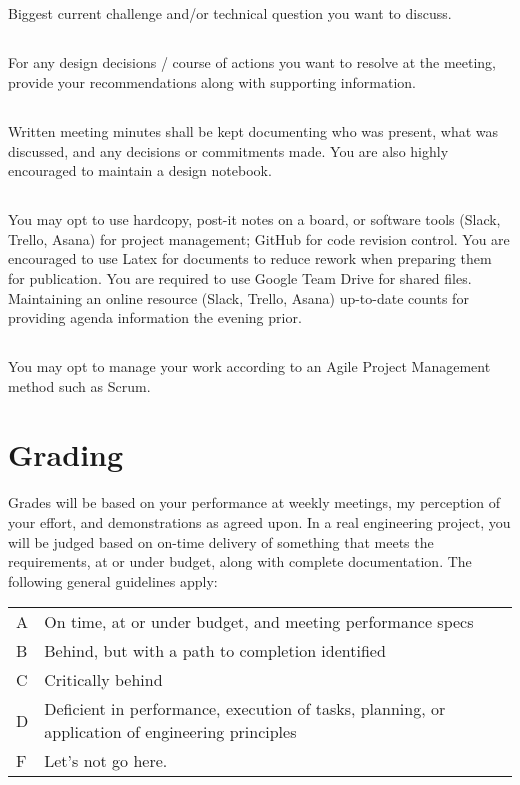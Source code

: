 \documentclass[10pt,courier]{navymemo}
\begin{document}
\subsection{} Biggest current challenge and/or technical question you want to discuss.
\subsection{} For any design decisions / course of actions you want to resolve at the meeting, provide your recommendations along with supporting information.
\subsection{} Written meeting minutes shall be kept documenting who was present, what was discussed, and any decisions or commitments made.  You are also highly encouraged to maintain a design notebook. 
\subsection{} You may opt to use hardcopy, post-it notes on a board, or software tools (Slack, Trello, Asana) for project management; GitHub for code revision control. You are encouraged to use Latex for documents to reduce rework when preparing them for publication. You are required to use Google Team Drive for shared files. Maintaining an online resource (Slack, Trello, Asana) up-to-date counts for providing agenda information the evening prior. 
\subsection{} You may opt to manage your work according to an Agile Project Management method such as Scrum. 

\section{Grading}
Grades will be based on your performance at weekly meetings, my perception of your effort, and demonstrations as agreed upon.  In a
\clearpage
\noindent real engineering project, you will be judged based on on-time delivery of something that meets the requirements, at or under budget, along with complete documentation. The following general guidelines apply: 
\begin{center}
\begin{tabular}{lp{5in}}
A & On time, at or under budget, and meeting performance specs \\
B & Behind, but with a path to completion identified \\
C & Critically behind \\
D & Deficient in performance, execution of tasks, planning, or application of engineering principles \\
F & Let's not go here. \\
\end{tabular}
\end{center}
\end{document}
